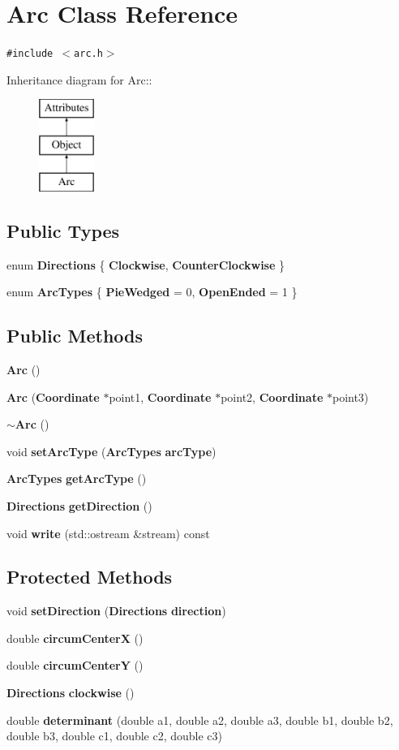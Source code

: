 \section{Arc Class Reference}
\label{classArc}
{\tt \#include $<$arc.h$>$}

Inheritance diagram for Arc::\begin{figure}[H]
\begin{center}
\leavevmode
\includegraphics[height=3cm]{classArc}
\end{center}
\end{figure}
\subsection*{Public Types}
\begin{CompactItemize}
\item 
enum {\bf Directions} \{ {\bf Clockwise}, 
{\bf Counter\-Clockwise}
 \}
\item 
enum {\bf Arc\-Types} \{ {\bf Pie\-Wedged} =  0, 
{\bf Open\-Ended} =  1
 \}
\end{CompactItemize}
\subsection*{Public Methods}
\begin{CompactItemize}
\item 
{\bf Arc} ()
\item 
{\bf Arc} ({\bf Coordinate} $\ast$point1, {\bf Coordinate} $\ast$point2, {\bf Coordinate} $\ast$point3)
\item 
{\bf $\sim$Arc} ()
\item 
void {\bf set\-Arc\-Type} ({\bf Arc\-Types} {\bf arc\-Type})
\item 
{\bf Arc\-Types} {\bf get\-Arc\-Type} ()
\item 
{\bf Directions} {\bf get\-Direction} ()
\item 
void {\bf write} (std::ostream \&stream) const
\end{CompactItemize}
\subsection*{Protected Methods}
\begin{CompactItemize}
\item 
void {\bf set\-Direction} ({\bf Directions} {\bf direction})
\item 
double {\bf circum\-Center\-X} ()
\item 
double {\bf circum\-Center\-Y} ()
\item 
{\bf Directions} {\bf clockwise} ()
\item 
double {\bf determinant} (double a1, double a2, double a3, double b1, double b2, double b3, double c1, double c2, double c3)
\end{CompactItemize}
